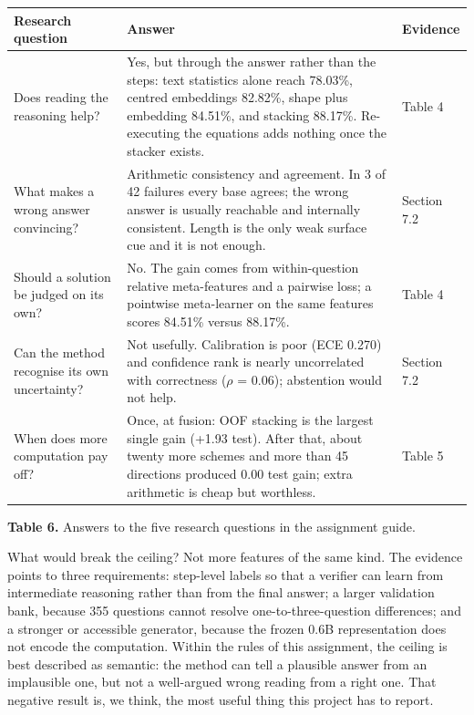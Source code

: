 \documentclass[10pt,a4paper]{article}
\begin{document}
\par\noindent\begin{minipage}{\textwidth}
\centering
{\footnotesize
\renewcommand{\arraystretch}{1.12}
\setlength{\tabcolsep}{3pt}
\begin{tabular}{@{}>{\raggedright\arraybackslash}p{3.99cm}>{\raggedright\arraybackslash}p{8.93cm}>{\centering\arraybackslash}p{2.28cm}@{}}
\hline
\textbf{Research question} & \textbf{Answer} & \textbf{Evidence} \\ \hline
Does reading the reasoning help? & Yes, but through the answer rather than the steps: text statistics alone reach 78.03\%, centred embeddings 82.82\%, shape plus embedding 84.51\%, and stacking 88.17\%. Re-executing the equations adds nothing once the stacker exists. & Table 4 \\
What makes a wrong answer convincing? & Arithmetic consistency and agreement. In 3 of 42 failures every base agrees; the wrong answer is usually reachable and internally consistent. Length is the only weak surface cue and it is not enough. & Section 7.2 \\
Should a solution be judged on its own? & No. The gain comes from within-question relative meta-features and a pairwise loss; a pointwise meta-learner on the same features scores 84.51\% versus 88.17\%. & Table 4 \\
Can the method recognise its own uncertainty? & Not usefully. Calibration is poor (ECE 0.270) and confidence rank is nearly uncorrelated with correctness ($\rho$ = 0.06); abstention would not help. & Section 7.2 \\
When does more computation pay off? & Once, at fusion: OOF stacking is the largest single gain (+1.93 test). After that, about twenty more schemes and more than 45 directions produced 0.00 test gain; extra arithmetic is cheap but worthless. & Table 5 \\
\hline
\end{tabular}}
\par\vspace{2.5pt}
{\footnotesize\raggedright\textbf{Table 6.} Answers to the five research questions in the assignment guide.\par}
\vspace{2pt}
\end{minipage}\par
\vspace{7pt}
What would break the ceiling? Not more features of the same kind. The evidence points to three requirements: step-level labels so that a verifier can learn from intermediate reasoning rather than from the final answer; a larger validation bank, because 355 questions cannot resolve one-to-three-question differences; and a stronger or accessible generator, because the frozen 0.6B representation does not encode the computation. Within the rules of this assignment, the ceiling is best described as semantic: the method can tell a plausible answer from an implausible one, but not a well-argued wrong reading from a right one. That negative result is, we think, the most useful thing this project has to report.
\end{document}
